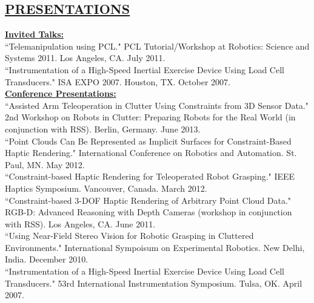 \documentclass[line,margin]{res}
\begin{document}
\begin{resume}
{\section{\underline{PRESENTATIONS}}
\vspace{1.0pc}
\textbf{\underline{Invited Talks:}}\\[0.4pc]
``Telemanipulation using PCL."
PCL Tutorial/Workshop at Robotics: Science and Systems 2011. Los Angeles, CA. July 2011. \\[0.4pc]
%
``Instrumentation of a High-Speed Inertial Exercise Device Using Load Cell Transducers."
ISA EXPO 2007. Houston, TX. October 2007. \\[0.4pc]
%
\textbf{\underline{Conference Presentations:}}\\[0.4pc]
%
``Assisted Arm Teleoperation in Clutter Using Constraints from 3D Sensor Data."
2nd Workshop on Robots in Clutter: Preparing Robots for the Real World (in conjunction with RSS).
Berlin, Germany. June 2013. \\[0.4pc]
%
``Point Clouds Can Be Represented as Implicit Surfaces for Constraint-Based Haptic Rendering."
International Conference on Robotics and Automation. St. Paul, MN. May 2012. \\[0.4pc]
%
``Constraint-based Haptic Rendering for Teleoperated Robot Grasping."
IEEE Haptics Symposium. Vancouver, Canada. March 2012. \\[0.4pc]
%
``Constraint-based 3-DOF Haptic Rendering of Arbitrary Point Cloud Data."
RGB-D: Advanced Reasoning with Depth Cameras (workshop in conjunction with RSS). Los Angeles, CA. June 2011. \\[0.4pc]
%
``Using Near-Field Stereo Vision for Robotic Grasping in Cluttered Environments."
International Sympoisum on Experimental Robotics. New Delhi, India. December 2010. \\[0.4pc]
%
``Instrumentation of a High-Speed Inertial Exercise Device Using Load Cell Transducers."
53rd International Instrumentation Symposium. Tulsa, OK. April 2007.
%
}
%

\end{resume}
\end{document}
